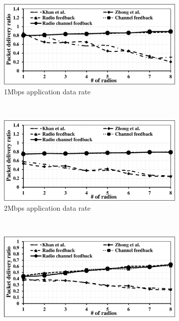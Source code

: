 \begin{landscape}
\begin{figure}[!htbp]
    \centering
    \begin{subfigure}[t]{0.625\textwidth}
        \includegraphics[width=\textwidth]{alltopology/32DeliveryRatio24d1}
        \caption{1Mbps application data rate}
    \end{subfigure}
    ~
    \begin{subfigure}[t]{0.625\textwidth}
        \includegraphics[width=\textwidth]{alltopology/32DeliveryRatio24d2}
        \caption{2Mbps application data rate}
    \end{subfigure}
    ~\\
    \begin{subfigure}[t]{0.625\textwidth}
        \includegraphics[width=\textwidth]{alltopology/32DeliveryRatio24d4}

\end{subfigure}
\end{figure}
\end{landscape}
